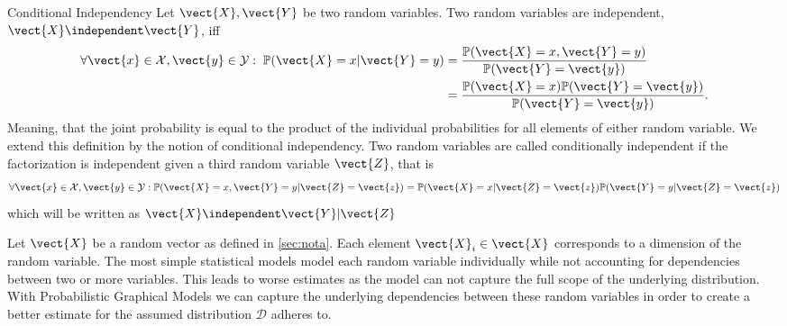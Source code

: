\begin{definition}{Conditional Independency}
    Let $\vect{X}, \vect{Y}$ be two random variables. Two random variables are independent,  $\vect{X} \independent \vect{Y}$, iff
    \begin{equation}
        \begin{split}
        \forall \vect{x} \in \mathcal{X}, \vect{y} \in \mathcal{Y}:  \; \mathbb{P}(\vect{X} = x \lvert \vect{Y} = y) &= \frac{\mathbb{P}(\vect{X} = x , \vect{Y} = y)}{\mathbb{P}(\vect{Y} = \vect{y})} \\
        &=  \frac{\mathbb{P}(\vect{X} = x) \mathbb{P}(\vect{Y} = \vect{y})}{\mathbb{P}(\vect{Y} = \vect{y})}.  \\
        \end{split}
    \end{equation} 
    Meaning, that the joint probability is equal to the product of the individual probabilities for all elements of either random variable.
    We extend this definition by the notion of conditional independency. 
    Two random variables are called conditionally independent if the factorization is independent given a third random variable $\vect{Z}$, that is
    \begin{equation}
        \forall \vect{x} \in \mathcal{X}, \vect{y} \in \mathcal{Y}: \mathbb{P}(\vect{X} = x , \vect{Y} = y \lvert \vect{Z} = \vect{z}) =   \mathbb{P}(\vect{X} = x \lvert \vect{Z} = \vect{z}) \mathbb{P}(\vect{Y} = y \lvert \vect{Z} = \vect{z})
    \end{equation}
    which will be written as $\vect{X} \independent \vect{Y} \lvert \vect{Z} $
\end{definition}

Let $\vect{X}$ be a random vector as defined in \sect \ref{sec:nota}. 
Each element $\vect{X}_i \in \vect{X}$ corresponds to a dimension of the random variable.
The most simple statistical models model each random variable individually while not accounting for dependencies between two or more variables.
This leads to worse estimates as the model can not capture the full scope of the underlying distribution.
With Probabilistic Graphical Models we can capture the underlying dependencies between these random variables in order to create a better estimate for the assumed distribution $\mathcal{D}$ adheres to.

